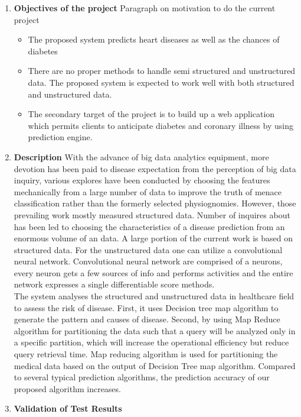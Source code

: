 \begin{abstracts}        
\normalsize{
\begin{enumerate}
\item \textbf{Objectives of the project} Paragraph on motivation to do the current project
	\begin{itemize}
		\item The proposed system predicts heart diseases as well as the chances of diabetes
		\item There are no proper methods to handle semi structured and unstructured data. The proposed system is expected to work well with both structured and unstructured data.
		\item The secondary target of the project is to build up a web application which permits clients to anticipate diabetes and coronary illness by using prediction engine.
\end{itemize}
\item \textbf{Description} With the advance of big data analytics equipment, more devotion has been paid to disease expectation from the perception of big data inquiry, various explores have been conducted by choosing the features mechanically from a large number of data to improve the truth of menace classification rather than the formerly selected physiognomies. However, those prevailing work mostly measured structured data. Number of inquires about has been led to choosing the characteristics of a disease prediction from an enormous volume of an data. A large portion of the current work is based on structured data. For the unstructured data one can utilize a convolutional neural network. Convolutional neural network are comprised of a neurons, every neuron gets a few sources of info and performs activities and the entire network expresses a single differentiable score methods.   \\
The system analyses the structured and unstructured data in healthcare field to assess the risk of disease. First, it uses Decision tree map algorithm to generate the pattern and causes of disease. Second, by using Map Reduce algorithm for partitioning the data such that a query will be analyzed only in a specific partition, which will increase the operational efficiency but reduce query retrieval time. Map reducing algorithm is used for partitioning the medical data based on the output of Decision Tree map algorithm. Compared to several typical prediction algorithms, the prediction accuracy of our proposed algorithm increases.
\item \textbf{Validation of Test Results}  

\end{enumerate}}
\end{abstracts}

